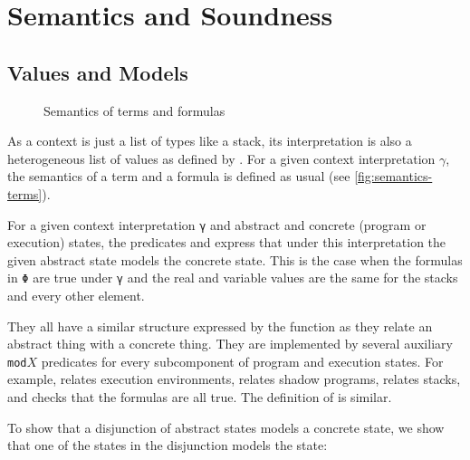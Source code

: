 \section{Semantics and Soundness}
\label{sec:semantics-soundness}

\subsection{Values and Models}\label{sec:values&models}

\begin{figure}[tp]
  \SemanticsTerms
  \SemanticsFormulas
  \caption{Semantics of terms and formulas}
  \label{fig:semantics-terms}
\end{figure}

As a context is just a list of types like a stack, its interpretation
is also a heterogeneous list of values as defined by .
For a given context interpretation $\gamma$, the semantics of a term
and a formula is defined as usual
(see \autoref{fig:semantics-terms}).

For a given context interpretation \verb/γ/ and abstract and concrete (program or execution) states,
the predicates  and  express that
under this interpretation the given abstract state models the concrete state.
This is the case when the formulas in \verb/Φ/ are true under \verb/γ/ and
the real and variable values are the same for the stacks and every
other element.
\SemanticsMODELING
\SemanticsModRho

They all have a similar structure expressed by the 
function as they relate an abstract thing with a concrete thing. They
are implemented by several auxiliary \verb/mod/$X$ predicates for every
subcomponent of program and execution states. For example, 
relates execution environments,  relates shadow programs,
 relates stacks, and  checks that the formulas
are all true. The definition of  is similar.

To show that a disjunction of abstract states models a concrete state,
we show that one of the states in the disjunction models the state:
\SemanticsModUS


